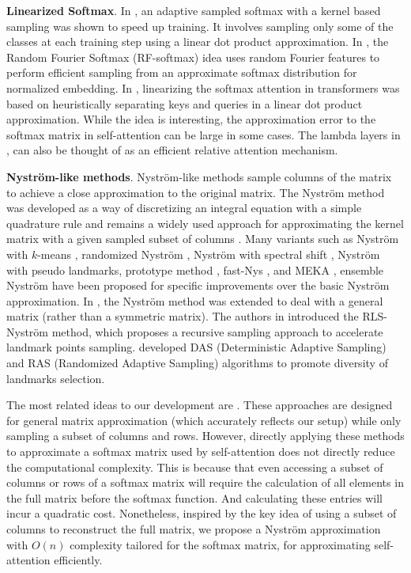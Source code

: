 \medskip
\textbf{Linearized Softmax}. In \cite{blanc2018adaptive}, an adaptive sampled softmax with a kernel based sampling was shown to speed up training. It involves sampling only some of the classes at each training step using a linear dot product approximation. In \cite{rawat2019sampled}, the Random Fourier Softmax (RF-softmax) idea uses random Fourier features to perform efficient sampling from an approximate softmax distribution for normalized embedding. In \cite{shen2018efficient,katharopoulos-et-al-2020}, linearizing the softmax attention in transformers was based on heuristically separating keys and queries in a linear dot product approximation. While the idea is interesting, the approximation error to the softmax matrix in self-attention can be large in some cases. The lambda layers in \cite{bello2021lambdanetworks}, can also be thought of as an efficient relative attention mechanism.

\medskip
\textbf{Nystr\"{o}m-like methods}. Nystr\"{o}m-like methods sample columns of the matrix to achieve a close approximation to the original matrix. The Nystr\"{o}m method \cite{baker1977numerical} was developed as a way of discretizing an integral equation with a simple quadrature rule and remains  a widely used approach for approximating the kernel matrix with a given sampled subset of columns \cite{williams2001using}. Many variants such as Nystr\"{o}m with $k$-means \cite{zhang2008improved,zhang2010clustered}, randomized Nystr\"{o}m \cite{li2010making}, Nystr\"{o}m with spectral shift \cite{wang2014improving}, Nystr\"{o}m with pseudo landmarks, prototype method \cite{wang2013improving,wang2016towards}, fast-Nys \cite{si2016computationally}, and MEKA \cite{si2017memory}, ensemble Nystr\"{o}m \cite{kumar2009ensemble} have been proposed for specific improvements over the basic Nystr\"{o}m approximation. In \cite{nemtsov2016matrix}, the Nystr\"{o}m method was extended to deal with a general matrix (rather than a symmetric matrix). The authors in \cite{musco2017recursive} introduced the RLS-Nyström method, which proposes a recursive sampling approach to accelerate landmark points sampling. \cite{fanuel2019nystr} developed DAS (Deterministic Adaptive Sampling) and RAS (Randomized Adaptive Sampling) algorithms to promote diversity of landmarks selection. 

The most related ideas to our development are  \cite{wang2013improving,musco2017recursive}. These approaches are designed for general matrix approximation (which accurately reflects our setup) while only sampling a subset of columns and rows. However, directly applying these methods to approximate a softmax matrix used by self-attention does not directly reduce the computational complexity. This is because that even accessing a subset of columns or rows of a softmax matrix will require the calculation of all elements in the full matrix before the softmax function. And calculating these entries will incur a quadratic cost. Nonetheless, inspired by the key idea of using a subset of columns to reconstruct the full matrix, we propose a Nystr\"{o}m approximation with $O(n)$ complexity tailored for the softmax matrix, for approximating self-attention efficiently.


